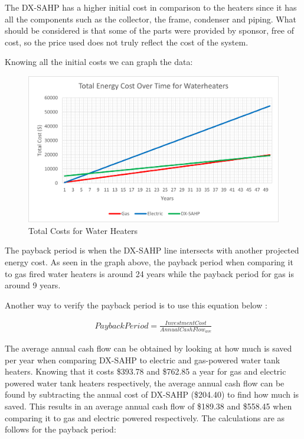 \medskip
The DX-SAHP has a higher initial cost in comparison to the heaters since it has all the components such as the collector, the frame, condenser and piping. What should be considered is that some of the parts were provided by sponsor, free of cost, so the price used does not truly reflect the cost of the system.

\medskip
Knowing all the initial costs we can graph the data:

\medskip
\begin{figure}[H]
    \centering
    \includegraphics[width=12.5cm]{images/economic_analysis.png}
    \caption{Total Costs for Water Heaters}
\end{figure}

\medskip
The payback period is when the DX-SAHP line intersects with another projected energy cost. As seen in the graph above, the payback period when comparing it to gas fired water heaters is around 24 years while the payback period for gas is around 9 years.

\medskip
Another way to verify the payback period is to use this equation below \cite{PBperiod}:

\begin{align}
    PaybackPeriod = \frac{InvestmentCost}{AnnualCashFlow_{ave}}
\end{align}

\medskip
The average annual cash flow can be obtained by looking at how much is saved per year when comparing DX-SAHP to electric and gas-powered water tank heaters. Knowing that it costs \$393.78 and \$762.85 a year for gas and electric powered water tank heaters respectively, the average annual cash flow can be found by subtracting the annual cost of DX-SAHP (\$204.40) to find how much is saved. This results in an average annual cash flow of \$189.38 and \$558.45 when comparing it to gas and electric powered respectively. The calculations are as follows for the payback period:

